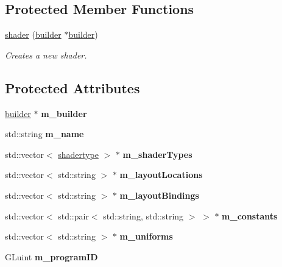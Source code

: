 \subsection*{Protected Member Functions}
\begin{DoxyCompactItemize}
\item 
\hyperlink{classflounder_1_1shader_ae8c052148333a4c06a4dd31b56b072cf}{shader} (\hyperlink{classflounder_1_1shader_1_1builder}{builder} $\ast$\hyperlink{classflounder_1_1shader_1_1builder}{builder})
\begin{DoxyCompactList}\small\item\em Creates a new shader. \end{DoxyCompactList}\end{DoxyCompactItemize}
\subsection*{Protected Attributes}
\begin{DoxyCompactItemize}
\item 
\mbox{\label{classflounder_1_1shader_a47675b1cb14100368f3ed5ef7338458c}} 
\hyperlink{classflounder_1_1shader_1_1builder}{builder} $\ast$ {\bfseries m\+\_\+builder}
\item 
\mbox{\label{classflounder_1_1shader_aaf406b4f20956f8ae7ca76dc8daad869}} 
std\+::string {\bfseries m\+\_\+name}
\item 
\mbox{\label{classflounder_1_1shader_a7937368d5fb8efdeb1f7c6134c2a4a00}} 
std\+::vector$<$ \hyperlink{classflounder_1_1shadertype}{shadertype} $>$ $\ast$ {\bfseries m\+\_\+shader\+Types}
\item 
\mbox{\label{classflounder_1_1shader_ae59400c4ad8488e858ee043d0417eb1a}} 
std\+::vector$<$ std\+::string $>$ $\ast$ {\bfseries m\+\_\+layout\+Locations}
\item 
\mbox{\label{classflounder_1_1shader_a48e1ade301155186e47e335865fb81cf}} 
std\+::vector$<$ std\+::string $>$ $\ast$ {\bfseries m\+\_\+layout\+Bindings}
\item 
\mbox{\label{classflounder_1_1shader_a44c9cad46e853ab5991d77e0d0e1fde6}} 
std\+::vector$<$ std\+::pair$<$ std\+::string, std\+::string $>$ $>$ $\ast$ {\bfseries m\+\_\+constants}
\item 
\mbox{\label{classflounder_1_1shader_a121ff2a41dd77d13e9c75e6a17f03770}} 
std\+::vector$<$ std\+::string $>$ $\ast$ {\bfseries m\+\_\+uniforms}
\item 
\mbox{\label{classflounder_1_1shader_a308e8bf681df24612a43a165948c1a21}} 
G\+Luint {\bfseries m\+\_\+program\+ID}
\end{DoxyCompactItemize}
